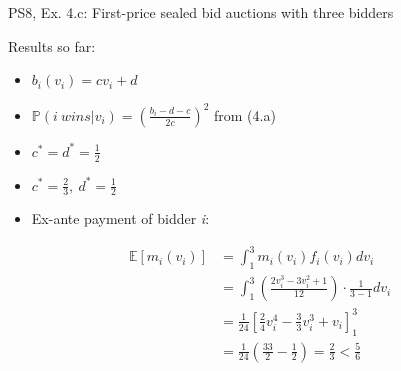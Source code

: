 \begin{frame}{PS8, Ex. 4.c: First-price sealed bid auctions with three bidders}
\begin{multicols}{2}
      \vspace{-4pt}
      \vfill\null\columnbreak
      Results so far:
      \vspace{-6pt}
      \begin{itemize}
        \item[($*$)] $b_i(v_i) = cv_i+d$
        \item[($\dagger$)] $\mathbb{P}(i\ wins|v_i)=\left(\frac{b_i-d-c}{2c}\right)^2$ from (4.a)
        \item[(3.a)] $c^*=d^*=\frac{1}{2}$
        \item[(4.a)] $c^*=\frac{2}{3},\ d^*=\frac{1}{2}$
        \item[\nth{2}:] Ex-ante payment of bidder \textit{i}:
      \end{itemize}
      \vspace{-12pt}
      \begin{align*}
        \mathbb{E}[m_i(v_i)]&=\textstyle\int_1^3m_i(v_i)f_i(v_i)dv_i\\
                            &=\textstyle\int_1^3\left(\frac{2v_i^3-3v_i^2+1}{12}\right)\cdot\frac{1}{3-1}dv_i\\
                            &=\frac{1}{24}\left[\frac{2}{4}v_i^4-\frac{3}{3}v_i^3+v_i\right]_1^3\\
                            &=\frac{1}{24}\left(\frac{33}{2}-\frac{1}{2}\right)=\frac{2}{3}<\frac{5}{6}
      \end{align*}
      \vfill\null
    \end{multicols}
    \vfill\null
\end{frame}
